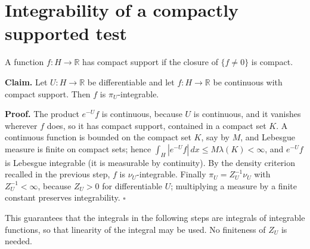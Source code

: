 \documentclass[11pt,a4paper]{article}
\begin{document}
\section{\texorpdfstring{Integrability of a compactly supported test}{Integrability of a compactly supported test}}


A function \(f:H\to\mathbb R\) has compact support if the closure of \(\{f\ne0\}\) is compact.




\textbf{Claim.} Let \(U:H\to\mathbb R\) be differentiable and let \(f:H\to\mathbb R\) be continuous with compact support. Then \(f\) is \(\pi_U\)-integrable.




\textbf{Proof.} The product \(e^{-U}f\) is continuous, because \(U\) is continuous, and it vanishes wherever \(f\) does, so it has compact support, contained in a compact set \(K\). A continuous function is bounded on the compact set \(K\), say by \(M\), and Lebesgue measure is finite on compact sets; hence \(\int_H|e^{-U}f|\,dx\le M\lambda(K)<\infty\), and \(e^{-U}f\) is Lebesgue integrable (it is measurable by continuity). By the density criterion recalled in the previous step, \(f\) is \(\nu_U\)-integrable. Finally \(\pi_U=Z_U^{-1}\nu_U\) with \(Z_U^{-1}<\infty\), because \(Z_U>0\) for differentiable \(U\); multiplying a measure by a finite constant preserves integrability. \(\square\)




This guarantees that the integrals in the following steps are integrals of integrable functions, so that linearity of the integral may be used. No finiteness of \(Z_U\) is needed.
\end{document}
